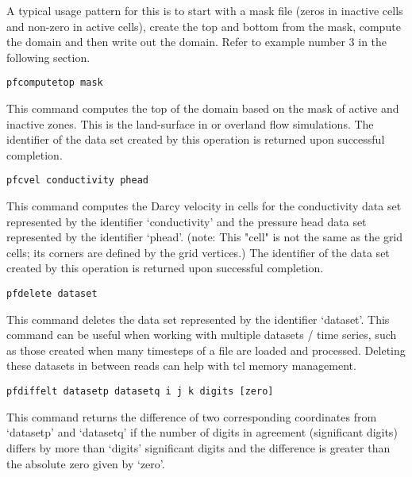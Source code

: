 \begin{description}
A typical usage pattern for this is to start with a mask file (zeros
 in inactive cells and non-zero in active cells), create the top and
 bottom from the mask, compute the domain and then write out the domain.
 Refer to example number 3 in the following section.

\item{\begin{verbatim}pfcomputetop mask\end{verbatim}}
This command computes the top of the domain based on the mask of
 active and inactive zones.  This is the land-surface in  or
 overland flow simulations.  The identifier of the data set created by
 this operation is returned upon successful completion.

\item{\begin{verbatim}pfcvel conductivity phead\end{verbatim}}
This command computes the Darcy velocity in cells for the conductivity data set
represented by the identifier `conductivity' and the pressure head
data set represented by the identifier `phead'.  (note: This "cell"
is not the same as the grid cells; its corners are defined by the
grid vertices.)  The identifier of the data set created by this
operation is returned upon successful completion.


\item{\begin{verbatim}pfdelete dataset\end{verbatim}}
This command deletes the data set represented by the identifier `dataset'. This
command can be useful when working with multiple datasets / time series, such as
those created when many timesteps of a file are loaded and processed.  Deleting these
datasets in between reads can help with tcl memory management.


\item{\begin{verbatim}pfdiffelt datasetp datasetq i j k digits [zero]\end{verbatim}}
This command returns the difference of two corresponding coordinates
from `datasetp' and `datasetq' if the number of digits in agreement
(significant digits) differs by more than `digits' significant
digits and the difference is greater than the absolute zero given
by `zero'.



\end{description}
